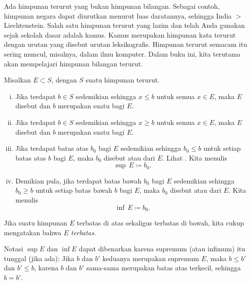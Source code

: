 Ada himpunan terurut yang bukan himpunan bilangan.  Sebagai contoh, himpunan
negara dapat diurutkan menurut luas daratannya, sehingga India $>$
Liechtenstein.
Salah satu himpunan terurut yang lazim dan telah Anda gunakan sejak sekolah dasar
adalah kamus.  Kamus merupakan himpunan kata terurut dengan urutan yang
disebut urutan leksikografis.  Himpunan terurut semacam itu sering muncul, misalnya,
dalam ilmu komputer.  Dalam buku ini, kita terutama akan mempelajari himpunan
bilangan terurut.

\begin{defn}
Misalkan $E \subset S$, dengan $S$ suatu himpunan terurut.
\begin{enumerate}[(i)]
\item Jika terdapat $b \in S$ sedemikian sehingga $x \leq b$ untuk semua $x \in E$,
maka $E$ disebut \emph{} dan $b$
merupakan suatu \emph{} bagi $E$.
\item Jika terdapat $b \in S$ sedemikian sehingga $x \geq b$ untuk semua $x \in E$,
maka $E$ disebut \emph{} dan $b$
merupakan suatu \emph{} bagi $E$.
\item Jika terdapat batas atas $b_0$ bagi $E$ sedemikian sehingga
$b_0 \leq b$ untuk setiap batas atas $b$ bagi $E$, maka
$b_0$ disebut \emph{} atau
\emph{}
dari $E$.  Lihat .  Kita menulis
\begin{equation*}
\sup\, E \coloneqq b_0 .
\end{equation*}
\item Demikian pula, jika terdapat batas bawah $b_0$ bagi $E$ sedemikian sehingga
$b_0 \geq b$ untuk setiap batas bawah $b$ bagi $E$, maka
$b_0$ disebut \emph{} atau
\emph{}
dari $E$.  Kita menulis
\begin{equation*}
\inf\, E \coloneqq b_0 .
\end{equation*}
\end{enumerate}
Jika suatu himpunan $E$ terbatas di atas sekaligus terbatas di bawah, kita cukup mengatakan bahwa
$E$ \emph{terbatas}.
\end{defn}

Notasi $\sup E$ dan $\inf E$ dapat dibenarkan karena
supremum (atau infimum) itu tunggal (jika ada): Jika $b$ dan
$b'$ keduanya merupakan supremum $E$, maka $b \leq b'$ dan $b' \leq b$, karena
$b$ dan $b'$ sama-sama merupakan batas atas terkecil, sehingga $b=b'$.


